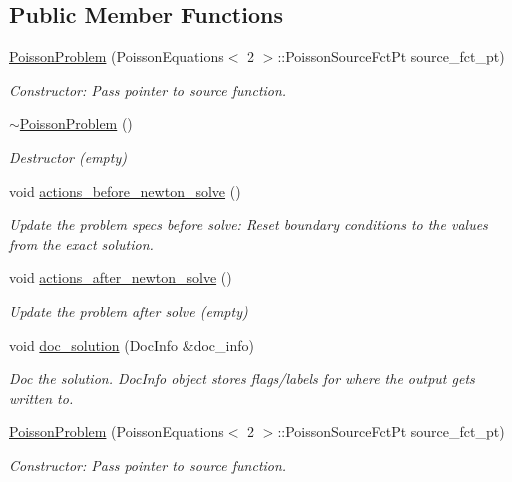 \subsection*{Public Member Functions}
\begin{DoxyCompactItemize}
\item 
\hyperlink{classPoissonProblem_a9c28346c473d246d8f61022365e742ea}{Poisson\+Problem} (Poisson\+Equations$<$ 2 $>$\+::Poisson\+Source\+Fct\+Pt source\+\_\+fct\+\_\+pt)
\begin{DoxyCompactList}\small\item\em Constructor\+: Pass pointer to source function. \end{DoxyCompactList}\item 
\hyperlink{classPoissonProblem_ac247e42d2d292200617f4b9db7ed1ab8}{$\sim$\+Poisson\+Problem} ()
\begin{DoxyCompactList}\small\item\em Destructor (empty) \end{DoxyCompactList}\item 
void \hyperlink{classPoissonProblem_a398608a5ff73b74c5a387b3f794c58df}{actions\+\_\+before\+\_\+newton\+\_\+solve} ()
\begin{DoxyCompactList}\small\item\em Update the problem specs before solve\+: Reset boundary conditions to the values from the exact solution. \end{DoxyCompactList}\item 
void \hyperlink{classPoissonProblem_a7a9478d8e1e5c7d3a886b00ab7d50bbd}{actions\+\_\+after\+\_\+newton\+\_\+solve} ()
\begin{DoxyCompactList}\small\item\em Update the problem after solve (empty) \end{DoxyCompactList}\item 
void \hyperlink{classPoissonProblem_aab6f503fa242f687bb8452527bb7688f}{doc\+\_\+solution} (Doc\+Info \&doc\+\_\+info)
\begin{DoxyCompactList}\small\item\em Doc the solution. Doc\+Info object stores flags/labels for where the output gets written to. \end{DoxyCompactList}\item 
\hyperlink{classPoissonProblem_a9c28346c473d246d8f61022365e742ea}{Poisson\+Problem} (Poisson\+Equations$<$ 2 $>$\+::Poisson\+Source\+Fct\+Pt source\+\_\+fct\+\_\+pt)
\begin{DoxyCompactList}\small\item\em Constructor\+: Pass pointer to source function. \end{DoxyCompactList}\item 

\end{DoxyCompactItemize}
